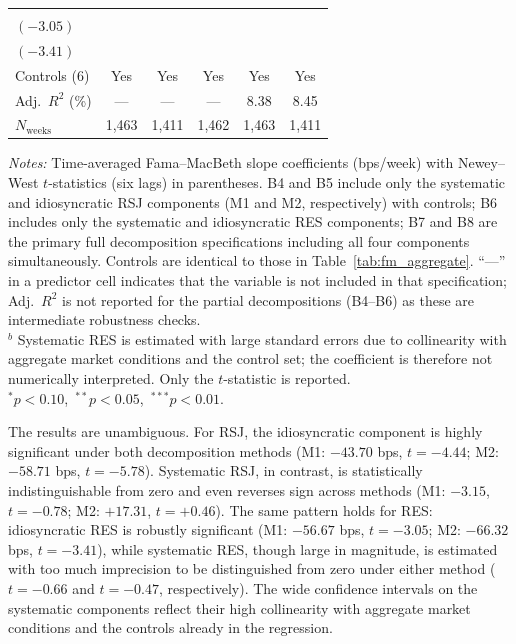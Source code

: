 \documentclass[11pt,a4paper]{article}
\begin{document}
\begin{table}[!htbp]
\begin{threeparttable}
\begin{tabular}{l c c c c c}
  & \makecell{$-56.67^{***}$\\[-3pt]{\scriptsize$(-3.05)$}}
  & \makecell{$-66.32^{***}$\\[-3pt]{\scriptsize$(-3.41)$}} \\[5pt]
Controls (6)        & Yes & Yes & Yes & Yes & Yes \\[2pt]
Adj.\ $R^{2}$ (\%) & ---  & ---  & ---  & 8.38 & 8.45 \\
$N_{\text{weeks}}$ & 1{,}463 & 1{,}411 & 1{,}462 & 1{,}463 & 1{,}411 \\
\bottomrule
\end{tabular}
\begin{tablenotes}
\footnotesize
\item \textit{Notes:} Time-averaged Fama--MacBeth slope coefficients (bps/week) with
Newey--West $t$-statistics (six lags) in parentheses. B4 and B5 include only the
systematic and idiosyncratic RSJ components (M1 and M2, respectively) with controls; B6
includes only the systematic and idiosyncratic RES components; B7 and B8 are the primary
full decomposition specifications including all four components simultaneously. Controls
are identical to those in Table~\ref{tab:fm_aggregate}. ``---'' in a predictor cell
indicates that the variable is not included in that specification; Adj.~$R^{2}$ is not
reported for the partial decompositions (B4--B6) as these are intermediate robustness
checks. \\
$^{b}$ Systematic RES is estimated with large standard errors due to collinearity with
aggregate market conditions and the control set; the coefficient is therefore not
numerically interpreted. Only the $t$-statistic is reported. \\
$^{*}p<0.10$,\ $^{**}p<0.05$,\ $^{***}p<0.01$.
\end{tablenotes}
\end{threeparttable}
\end{table}

The results are unambiguous. For RSJ, the idiosyncratic component is highly significant
under both decomposition methods (M1: $-43.70$ bps, $t=-4.44$; M2: $-58.71$ bps,
$t=-5.78$). Systematic RSJ, in contrast, is statistically indistinguishable from zero
and even reverses sign across methods (M1: $-3.15$, $t=-0.78$; M2: $+17.31$,
$t=+0.46$). The same pattern holds for RES: idiosyncratic RES is robustly significant
(M1: $-56.67$ bps, $t=-3.05$; M2: $-66.32$ bps, $t=-3.41$), while systematic RES,
though large in magnitude, is estimated with too much imprecision to be distinguished
from zero under either method ($t=-0.66$ and $t=-0.47$, respectively). The wide
confidence intervals on the systematic components reflect their high collinearity with
aggregate market conditions and the controls already in the regression.
\end{document}
